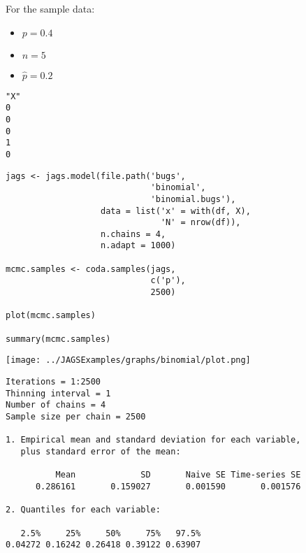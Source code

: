 \documentclass{beamer}
\begin{document}
\begin{frame}[fragile]
  For the sample data:
  \begin{itemize}
    \item{$p = 0.4$}
    \item{$n = 5$}
    \item{$\hat{p} = 0.2$}
  \end{itemize}
\end{frame}

\begin{frame}[fragile]
  \begin{verbatim}
"X"
0
0
0
1
0
  \end{verbatim}
\end{frame}

\begin{frame}[fragile]
  \begin{verbatim}
jags <- jags.model(file.path('bugs', 
                             'binomial',
                             'binomial.bugs'),
                   data = list('x' = with(df, X),
                               'N' = nrow(df)),
                   n.chains = 4,
                   n.adapt = 1000)
                   
mcmc.samples <- coda.samples(jags,
                             c('p'),
                             2500)

plot(mcmc.samples)

summary(mcmc.samples)
  \end{verbatim}
\end{frame}

\begin{frame}[fragile]
  \begin{center}
    \texttt{[image: ../JAGSExamples/graphs/binomial/plot.png]}
  \end{center}
\end{frame}

\begin{frame}[fragile]
  \begin{verbatim}
Iterations = 1:2500
Thinning interval = 1 
Number of chains = 4 
Sample size per chain = 2500 

1. Empirical mean and standard deviation for each variable,
   plus standard error of the mean:

          Mean             SD       Naive SE Time-series SE 
      0.286161       0.159027       0.001590       0.001576 

2. Quantiles for each variable:

   2.5%     25%     50%     75%   97.5% 
0.04272 0.16242 0.26418 0.39122 0.63907 
  \end{verbatim}
\end{frame}
\end{document}
